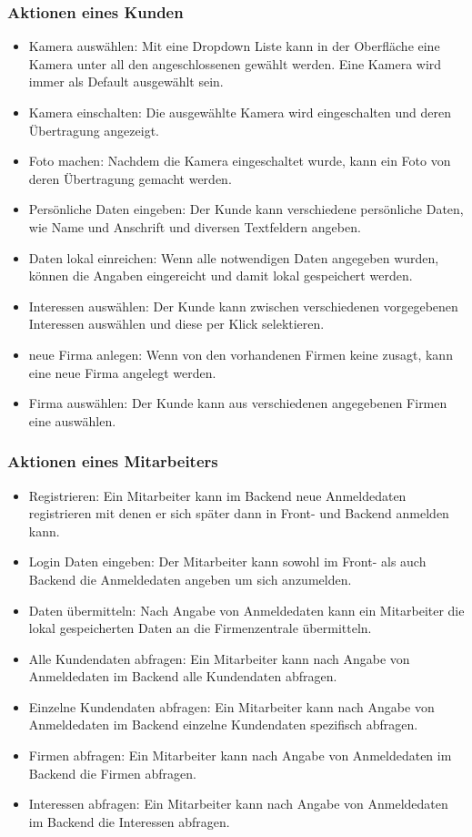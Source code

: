 \subsubsection{Aktionen eines Kunden}
\begin{itemize}
	\item Kamera auswählen: Mit eine Dropdown Liste kann in der Oberfläche eine Kamera unter all den angeschlossenen gewählt werden. Eine Kamera wird immer als Default ausgewählt sein.
	\item Kamera einschalten: Die ausgewählte Kamera wird eingeschalten und deren Übertragung angezeigt.
	\item Foto machen: Nachdem die Kamera eingeschaltet wurde, kann ein Foto von deren Übertragung gemacht werden.
	\item Persönliche Daten eingeben: Der Kunde kann verschiedene persönliche Daten, wie Name und Anschrift und diversen Textfeldern angeben.
	\item Daten lokal einreichen: Wenn alle notwendigen Daten angegeben wurden, können die Angaben eingereicht und damit lokal gespeichert werden.
	\item Interessen auswählen: Der Kunde kann zwischen verschiedenen vorgegebenen Interessen auswählen und diese per Klick selektieren.
	\item neue Firma anlegen: Wenn von den vorhandenen Firmen keine zusagt, kann eine neue Firma angelegt werden.
	\item Firma auswählen: Der Kunde kann aus verschiedenen angegebenen Firmen eine auswählen.
\end{itemize}

\subsubsection{Aktionen eines Mitarbeiters}
\begin{itemize}
	\item Registrieren: Ein Mitarbeiter kann im Backend neue Anmeldedaten registrieren mit denen er sich später dann in Front- und Backend anmelden kann.
	\item Login Daten eingeben: Der Mitarbeiter kann sowohl im Front- als auch Backend die Anmeldedaten angeben um sich anzumelden.
	\item Daten übermitteln: Nach Angabe von Anmeldedaten kann ein Mitarbeiter die lokal gespeicherten Daten an die Firmenzentrale übermitteln.
	\item Alle Kundendaten abfragen: Ein Mitarbeiter kann nach Angabe von Anmeldedaten im Backend alle Kundendaten abfragen.
	\item Einzelne Kundendaten abfragen: Ein Mitarbeiter kann nach Angabe von Anmeldedaten im Backend einzelne Kundendaten spezifisch abfragen.
	\item Firmen abfragen: Ein Mitarbeiter kann nach Angabe von Anmeldedaten im Backend die Firmen abfragen.
	\item Interessen abfragen: Ein Mitarbeiter kann nach Angabe von Anmeldedaten im Backend die Interessen abfragen.
\end{itemize}
\newpage

